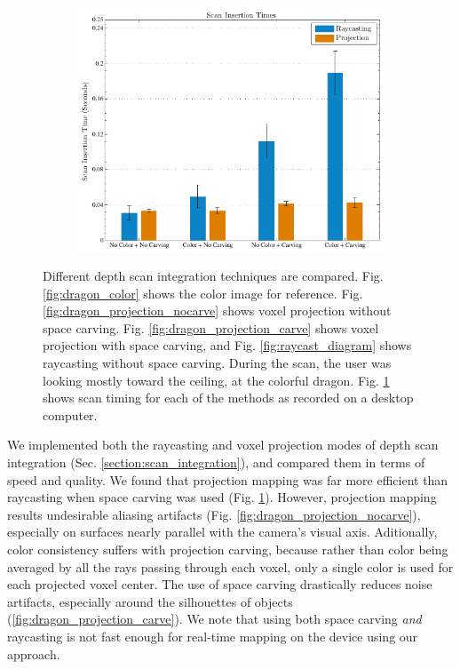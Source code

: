 \documentclass[conference,10pt]{IEEEtran}
\begin{document}
\begin{figure}[t]
\begin{subfigure}{1.0\columnwidth}
		 \includegraphics[width=1.0\textwidth]{img/ScanTiming.pdf} 
		 \caption{}
		 \label{fig:timing}
	 \end{subfigure} 
	 \caption{Different depth scan integration techniques are compared. Fig.
	 \ref{fig:dragon_color} shows the color image for reference. Fig.
	 \ref{fig:dragon_projection_nocarve} shows voxel projection without space
	 carving. Fig. \ref{fig:dragon_projection_carve} shows voxel projection with
	 space carving, and Fig. \ref{fig:raycast_diagram} shows raycasting without
	 space carving. During the scan, the user was looking mostly toward the
	 ceiling, at the colorful dragon. Fig. \ref{fig:timing} shows scan timing for
	 each of the methods as recorded on a desktop computer.}
	 \label{fig:dragon}
 \end{figure}  
 
 
We implemented both the raycasting and voxel projection modes of depth scan
integration (Sec. \ref{section:scan_integration}), and compared them in terms of
speed and quality. We found that projection mapping was far more efficient than
raycasting when space carving was used (Fig. \ref{fig:timing}). However,
projection mapping results undesirable aliasing artifacts
(Fig. \ref{fig:dragon_projection_nocarve}), especially on surfaces nearly
parallel with the camera's visual axis. Aditionally, color consistency suffers
with projection carving, because rather than color being averaged by all the
rays passing through each voxel, only a single color is used for each projected
voxel center. The use of space carving drastically reduces noise artifacts,
especially around the silhouettes of objects
(\ref{fig:dragon_projection_carve}). We note that using both space carving
\emph{and} raycasting is not fast enough for real-time mapping on the device
using our approach.
\end{document}
